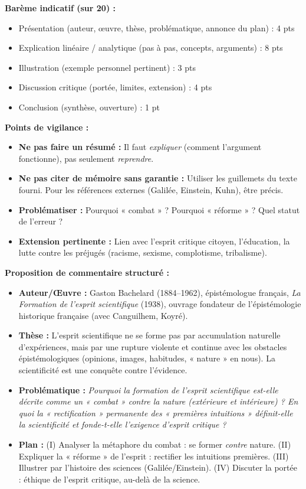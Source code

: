 \documentclass[11pt]{article}
\newcommand{\cle}[1]{{\popxbold\color{popdark}#1}}
\newcounter{popsec}
\newcounter{popsub}
\newcommand{\courssub}[1]{%
  \stepcounter{popsub}%
  \par\vspace{9pt}\noindent{\popxbold\fontsize{11.5}{13}\selectfont\color{popink}{\color{poporange}\thepopsec.\thepopsub}\hspace{6pt}#1}\par\nopagebreak\vspace{4pt}
}
\begin{document}
\begin{corrige}
\textbf{Barème indicatif (sur 20) :}
\begin{itemize}
\item Présentation (auteur, œuvre, thèse, problématique, annonce du plan) : 4 pts
\item Explication linéaire / analytique (pas à pas, concepts, arguments) : 8 pts
\item Illustration (exemple personnel pertinent) : 3 pts
\item Discussion critique (portée, limites, extension) : 4 pts
\item Conclusion (synthèse, ouverture) : 1 pt
\end{itemize}

\textbf{Points de vigilance :}
\begin{itemize}
\item \textbf{Ne pas faire un résumé :} Il faut \emph{expliquer} (comment l'argument fonctionne), pas seulement \emph{reprendre}.
\item \textbf{Ne pas citer de mémoire sans garantie :} Utiliser les guillemets du texte fourni. Pour les références externes (Galilée, Einstein, Kuhn), être précis.
\item \textbf{Problématiser :} Pourquoi « combat » ? Pourquoi « réforme » ? Quel statut de l'erreur ?
\item \textbf{Extension pertinente :} Lien avec l'esprit critique citoyen, l'éducation, la lutte contre les préjugés (racisme, sexisme, complotisme, tribalisme).
\end{itemize}

\textbf{Proposition de commentaire structuré :}

\courssub{Présentation et Problématique}
\begin{itemize}
\item \textbf{Auteur/Œuvre :} Gaston Bachelard (1884–1962), épistémologue français, \emph{La Formation de l'esprit scientifique} (1938), ouvrage fondateur de l'épistémologie historique française (avec Canguilhem, Koyré).
\item \textbf{Thèse :} L'esprit scientifique ne se forme pas par accumulation naturelle d'expériences, mais par une \cle{rupture} violente et continue avec les \cle{obstacles épistémologiques} (opinions, images, habitudes, « nature » en nous). La scientificité est une \cle{conquête} contre l'évidence.
\item \textbf{Problématique :} \emph{Pourquoi la formation de l'esprit scientifique est-elle décrite comme un « combat » contre la nature (extérieure et intérieure) ? En quoi la « rectification » permanente des « premières intuitions » définit-elle la scientificité et fonde-t-elle l'exigence d'esprit critique ?}
\item \textbf{Plan :} (I) Analyser la métaphore du combat : se former \emph{contre} nature. (II) Expliquer la « réforme » de l'esprit : rectifier les intuitions premières. (III) Illustrer par l'histoire des sciences (Galilée/Einstein). (IV) Discuter la portée : éthique de l'esprit critique, au-delà de la science.
\end{itemize}


\end{corrige}
\end{document}
